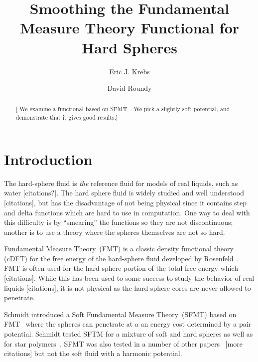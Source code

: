 \documentclass[letterpaper,twocolumn,amsmath,amssymb,prb]{revtex4-1}
\newcommand{\red}[1]{{\color{red} #1}}
\newcommand{\fixme}[1]{\red{[#1]}}
\begin{document}
\title{Smoothing the Fundamental Measure Theory Functional for Hard Spheres}

\author{Eric J. Krebs}

\author{David Roundy}

\begin{abstract}
\fixme{ We examine a functional based on SFMT~\cite{schmidt2000fluid}.
  We pick a slightly soft potential, and demonstrate that it gives
  good results.}
\end{abstract}

\maketitle

\section{Introduction}

The hard-sphere fluid is \emph{the} reference fluid for models of real
liquids, such as water \fixme{citations?}. The hard sphere fluid is
widely studied and well understood \fixme{citations}, but has the
disadvantage of not being physical since it contains step and delta
functions which are hard to use in computation. One way to deal with
this difficulty is by ``smearing'' the functions so they are not
discontinuous; another is to use a theory where the spheres themselves
are not so hard.

Fundamental Measure Theory~(FMT) is a classic density functional
theory (cDFT) for the free energy of the hard-sphere fluid developed
by Rosenfeld~\cite{rosenfeld1989}.  FMT is often used for the
hard-sphere portion of the total free energy which \fixme{citations}.
While this has been used to some success to study the behavior of real
liquids\fixme{citations}, it is not physical as the hard sphere cores
are never allowed to penetrate.

Schmidt introduced a Soft Fundamental Measure Theory~(SFMT) based on
FMT~\cite{schmidt1999density} where the spheres can penetrate at a an
energy cost determined by a pair potential. Schmidt tested SFTM for a
mixture of soft and hard spheres as well as for star
polymers~\cite{schmidt2000density, groh2001density}. SFMT was also
tested in a number of other papers~\cite{rosenfeld2000fluid}
\fixme{more citations} but not the soft fluid with a harmonic
potential.
\end{document}
